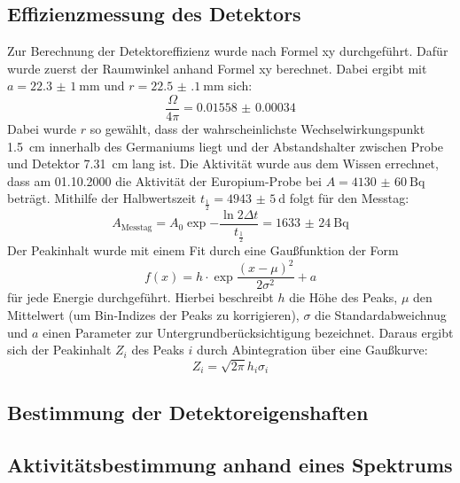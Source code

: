 \subsection{Effizienzmessung des Detektors}
\label{sec:Effizienzmessung}
Zur Berechnung der Detektoreffizienz wurde nach Formel xy durchgeführt.  %
Dafür wurde zuerst der Raumwinkel anhand Formel xy berechnet. Dabei  %
ergibt mit $a = \SI{22.3(10)}{\milli\meter}$ und $r = \SI{22.5(1)}{\milli\meter}$
sich:
\begin{equation}
  \frac{\Omega}{4\pi} = \num{0.01558(34)}
\end{equation}
Dabei wurde $r$ so gewählt, dass der wahrscheinlichste Wechselwirkungspunkt
\SI{1.5}{\centi\meter} innerhalb des Germaniums liegt und der Abstandshalter
zwischen Probe und Detektor \SI{7.31}{\centi\meter} lang ist.
Die Aktivität wurde aus dem Wissen errechnet, dass am 01.10.2000 die Aktivität
der Europium-Probe bei $A = \SI{4130(60)}{\becquerel}$ beträgt. Mithilfe der
Halbwertszeit $t_\frac{1}{2} = \SI{4943(5)}{\day}$ folgt für den Messtag:
\begin{equation}
    A_\text{Messtag} = A_0 \exp{-\frac{\ln{2} \Delta t}{t_\frac{1}{2}}}=\SI{1633(24)}{\becquerel}
\end{equation}
Der Peakinhalt wurde mit einem Fit durch eine Gaußfunktion der Form
\begin{equation}
  f(x) = h\cdot \exp{\frac{(x-\mu)^2}{2\sigma^2}} + a
\end{equation}
für jede Energie durchgeführt. Hierbei beschreibt $h$ die Höhe des Peaks, $\mu$
den Mittelwert (um Bin-Indizes der Peaks zu korrigieren), $\sigma$ die
Standardabweichnug und $a$ einen Parameter zur Untergrundberücksichtigung
bezeichnet.
Daraus ergibt sich der Peakinhalt $Z_i$ des Peaks $i$ durch Abintegration über
eine Gaußkurve:
\begin{equation}
  Z_i = \sqrt{2\pi} h_i \sigma_i
\end{equation}


\subsection{Bestimmung der Detektoreigenshaften}
\label{sec:Detektoreigenschaften}

\subsection{Aktivitätsbestimmung anhand eines Spektrums}
\label{sec:Aktivitätsbestimmung}

